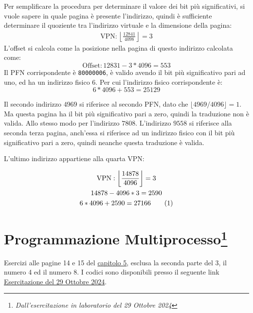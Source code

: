 \documentclass{article}
\numberwithin{equation}{subsection}
\newcommand{\tageq}{\tag{\stepcounter{equation}\theequation}}
\begin{document}
Per semplificare la procedura per determinare il valore dei bit più significativi, si vuole sapere in quale pagina è presente l'indirizzo, quindi è sufficiente determinare 
il quoziente tra l'indirizzo virtuale e la dimensione della pagina:
\begin{gather*}
    \mathrm{VPN}:\left\lfloor\displaystyle\frac{12841}{4098}\right\rfloor=3
\end{gather*}
L'offset si calcola come la posizione nella pagina di questo indirizzo calcolata come:
\begin{equation*}
    \mathrm{Offset}:12831-3*4096=553
\end{equation*}
Il PFN corrispondente è \verb|80000006|, è valido avendo il bit più significativo pari ad uno, ed ha un indirizzo fisico 6. Per cui l'indirizzo fisico corrispondente è:
\begin{equation}
    6*4096+553=25129
\end{equation}

Il secondo indirizzo $4969$ si riferisce al secondo PFN, dato che $\lfloor4969/4096\rfloor=1$. Ma questa pagina ha il bit più significativo pari a zero, quindi la traduzione 
non è valida. Allo stesso modo per l'indirizzo $7808$. L'indirizzo $9558$ si riferisce alla seconda terza pagina, anch'essa si riferisce ad un indirizzo fisico con 
il bit più significativo pari a zero, quindi neanche questa traduzione è valida. 

L'ultimo indirizzo appartiene alla quarta VPN: 

\begin{gather*}
    \mathrm{VPN}:\left\lfloor\displaystyle\frac{14878}{4096}\right\rfloor=3\\
    14878-4096*3=2590\\
    6*4096+2590=27166\tageq
\end{gather*}

\clearpage

\section{Programmazione Multiprocesso\footnote{\textit{Dall'esercitazione in laboratorio del 29 Ottobre 2024}}}

Esercizi alle pagine 14 e 15 del \href{https://pages.cs.wisc.edu/~remzi/OSTEP/cpu-api.pdf}{capitolo 5}, esclusa la seconda parte del 3, il numero 4 ed il numero 8. I codici sono disponibili presso il seguente link \href{https://github.com/00Darxk/Sistemi-Operativi/tree/main/Esercizi/Esercitazione%20del%2029-10-24/}{Esercitazione del 29 Ottobre 2024}.
\end{document}
